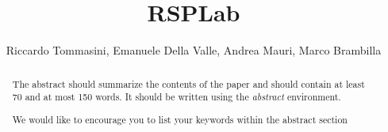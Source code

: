 \documentclass[runningheads,a4paper]{llncs}
\newcommand{\keywords}[1]{\par\addvspace\baselineskip
\noindent\keywordname\enspace\ignorespaces#1}
\begin{document}
\title{RSPLab}


\maketitle

\author{Riccardo Tommasini, Emanuele Della Valle, Andrea Mauri, Marco Brambilla}



\begin{abstract}
The abstract should summarize the contents of the paper and should
contain at least 70 and at most 150 words. It should be written using the
\emph{abstract} environment.
\keywords{We would like to encourage you to list your keywords within
the abstract section}
\end{abstract}



\end{document}
